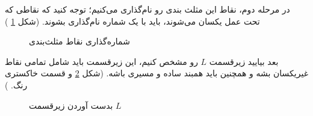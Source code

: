 \documentclass[a4paper, 12pt]{article}
\begin{document}
  در مرحله دوم، نقاط این مثلث بندی رو نام‌گذاری می‌کنیم؛ توجه کنید که نقاطی که تحت عمل 
  یکسان می‌شوند، باید با یک شماره نام‌گذاری بشوند. (شکل
  \ref{pic2}
  )
   \begin{figure}[h]
  	\caption{شماره‌گذاری نقاط مثلث‌بندی
  	}
  	\label{pic2}
  \end{figure}
  
  \noindent
  بعد بیایید زیرقسمت 
  $L$
  رو مشخص کنیم، این زیرقسمت باید شامل تمامی نقاط غیریکسان بشه و همچنین باید همبند ساده و مسیری باشه. (شکل 
  \ref{pic3}
  و قسمت خاکستری رنگ.
  )
     \begin{figure}[h]
  	\caption{بدست آوردن زیرقسمت
  	$L$
  	  	}
  	\label{pic3}
  \end{figure}
  
\end{document}
